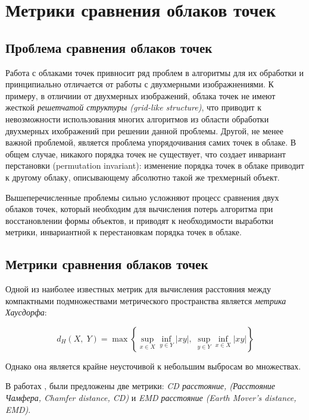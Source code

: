 \section{Метрики сравнения облаков точек} \label{section:metrics-comparation}

\subsection{Проблема сравнения облаков точек}

Работа с облаками точек привносит ряд проблем в алгоритмы для их обработки и принципиально отличается от работы с двухмерными изображнениями. К примеру, в отличиии от двухмерных изображений, облака точек не имеют жесткой \textit{решетчатой структуры (grid-like structure)}, что приводит к невозможности использования многих алгоритмов из области обработки двухмерных ихображений при решении данной проблемы. Другой, не менее важной проблемой, является проблема упорядочивания самих точек в облаке. В общем случае, никакого порядка точек не существует, что создает инвариант перстановки (permutation invariant): изменение порядка точек в облаке приводит к другому облаку, описывающему абсолютно такой же трехмерный объект.

Вышеперечисленные проблемы сильно усложняют процесс сравнения двух облаков точек, который необходим для вычисления потерь алгоритма при восстановлении формы объектов, и приводят к необходимости выработки метрики, инвариантной к перестановкам порядка точек в облаке.


\subsection{Метрики сравнения облаков точек}

Одной из наиболее известных метрик для вычисления расстояния между компактными подмножествами метрического пространства является \textit{метрика Хаусдорфа}:

\[
	d_{H}(X,\;Y)=\max \left\{\sup\limits_{{x\in X}}\inf\limits_{{y\in Y}}|xy|,\;\sup\limits_{{y\in Y}}\inf\limits_{{x\in X}}|xy|\right\}
\]

Однако она является крайне неусточивой к небольшим выбросам во множествах.


В работах \cite{metrics-source}, \cite{lrgm-cloud} были предложены две метрики: \textit{CD расстояние, (Расстояние Чамфера, Chamfer distance, CD)} и \textit{EMD расстояние (Earth Mover’s distance, EMD)}.

